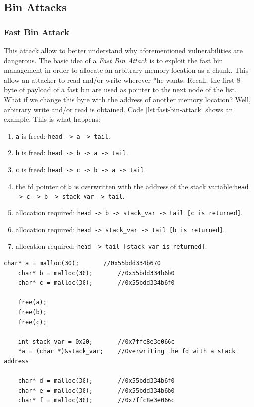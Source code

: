 \documentclass{article}
\numberwithin{equation}{subsection}
\begin{document}
\subsection{Bin Attacks}
\subsubsection{Fast Bin Attack}
This attack allow to better understand why aforementioned vulnerabilities are dangerous. The basic idea of a \emph{Fast Bin Attack} is to exploit the fast bin management in order to allocate an arbitrary memory location as a chunk. This allow an attacker to read and/or write wherever *he wants. Recall: the first 8 byte of payload of a fast bin are used as pointer to the next node of the list.\newline
\noindent
What if we change this byte with the address of another memory location?
\newline
\noindent
Well, arbitrary write and/or read is obtained. Code \ref{lst:fast-bin-attack} shows an example.
This is what happens:
\begin{enumerate}
    \item \texttt{a} is freed: \texttt{head -> a -> tail}.
    \item \texttt{b} is freed: \texttt{head -> b -> a -> tail}.
    \item \texttt{c} is freed: \texttt{head -> c ->  b -> a -> tail}.
    \item the fd pointer of \texttt{b} is overwritten with the address of the stack variable:\newline\texttt{head -> c ->  b -> stack\_var -> tail}.
    \item allocation required: \newline\texttt{head ->  b -> stack\_var -> tail [c is returned]}.
    \item allocation required: \texttt{head -> stack\_var -> tail [b is returned]}.
    \item allocation required: \texttt{head -> tail [stack\_var is returned]}.
\end{enumerate}
\begin{minipage}{\textwidth}
\centering
    \lstset{style=cstyle}
    \begin{lstlisting}[caption={Fast bin attack example.},captionpos=b,label={lst:fast-bin-attack}]
    char* a = malloc(30);       //0x55bdd334b670 
    char* b = malloc(30);       //0x55bdd334b6b0
    char* c = malloc(30);       //0x55bdd334b6f0
    
    free(a);
    free(b);
    free(c);
    
    int stack_var = 0x20;       //0x7ffc8e3e066c
    *a = (char *)&stack_var;    //Overwriting the fd with a stack address
    
    char* d = malloc(30);       //0x55bdd334b6f0 
    char* e = malloc(30);       //0x55bdd334b6b0
    char* f = malloc(30);       //0x7ffc8e3e066c
\end{lstlisting}
\end{minipage}
\end{document}
